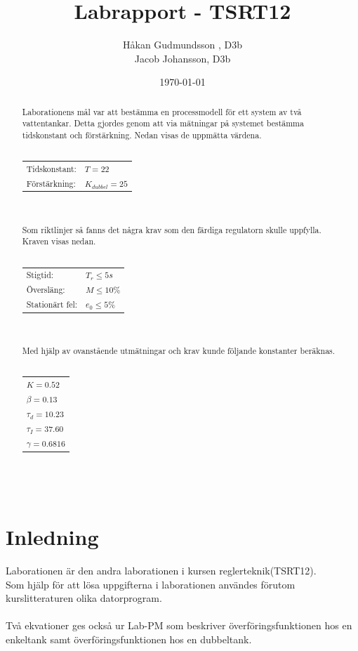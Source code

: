 \documentclass[a4paper]{article}
\title{Labrapport - TSRT12}
\author{Håkan Gudmundsson , D3b \\ Jacob Johansson, D3b}
\date{\today}
\begin{document}
\maketitle
\newpage

\begin{abstract}

Laborationens mål var att bestämma en processmodell för ett system av två vattentankar.
Detta gjordes genom att via mätningar på systemet bestämma tidskonstant och förstärkning.
Nedan visas de uppmätta värdena.
\\\\
\begin{tabular}{l l}
  Tidskonstant: & $T = 22$ \\
  Förstärkning: & $K_{dubbel} = 25$ 
\end{tabular}
\\\\
Som riktlinjer så fanns det några krav som den färdiga regulatorn skulle uppfylla.
Kraven visas nedan.
\\\\
\begin{tabular}{l l}
  Stigtid: & $T_{r} \leq 5s$ \\
  Översläng: & $M \leq 10\%$ \\
  Stationärt fel: & $e_{0} \leq 5\% $ 
\end{tabular}
\\\\
Med hjälp av ovanstående utmätningar och krav kunde följande konstanter beräknas.
\\\\
\begin{tabular}{l}
  $K = 0.52$ \\
  $\beta = 0.13$ \\
  $\tau_{d} = 10.23$ \\
  $\tau_{I} = 37.60$ \\
  $\gamma = 0.6816$ 
\end{tabular}
\\\\
\end{abstract}

\newpage
\tableofcontents
\newpage

\section{Inledning}

Laborationen är den andra laborationen i kursen reglerteknik(TSRT12). \\
Som hjälp för att lösa uppgifterna i laborationen användes förutom kurslitteraturen olika datorprogram. 
\\\\
Två ekvationer ges också ur Lab-PM som beskriver överföringsfunktionen hos en enkeltank samt överföringsfunktionen hos en dubbeltank.
\end{document}
